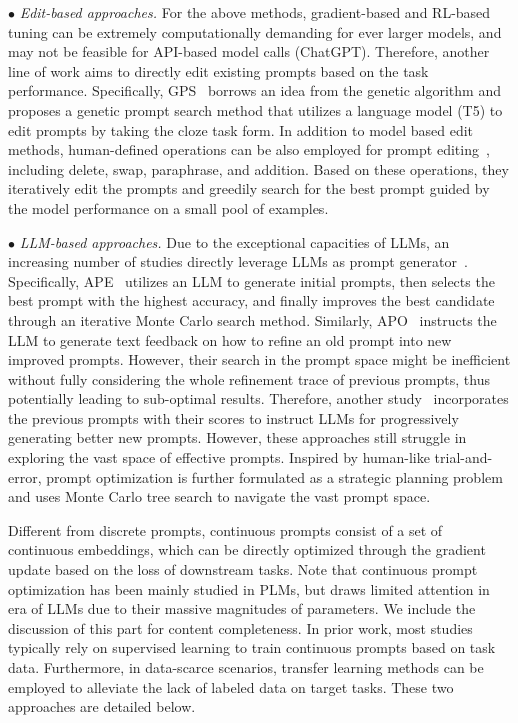 $\bullet$  {\textit{Edit-based approaches.} 
For the above methods, gradient-based and RL-based tuning can be extremely computationally demanding for ever larger models, and may not be feasible for API-based model calls (\eg ChatGPT). Therefore, another line of work aims to directly edit existing prompts based on the task performance. Specifically, GPS~\cite{Xu-EMNLP-2022-GPS} borrows an idea from the genetic algorithm and proposes a genetic prompt search method that utilizes a language model (\ie T5) to edit prompts by  taking the cloze task form. In addition to model based edit methods, human-defined  operations can be also employed for prompt editing~\cite{Prasad-EACL-2023-GrIPS}, including delete, swap, paraphrase, and addition. Based on these operations, they iteratively edit the prompts and greedily search for the best prompt guided by the model performance on a small pool of examples.}

$\bullet$  {\textit{LLM-based approaches.} Due to the exceptional capacities of LLMs, an increasing number of studies directly leverage LLMs as prompt generator~\cite{Zhou-ICLR-2023-Large,Pryzant-CoRR-2023-Automatic,Yang-CoRR-2023-Large}. Specifically, APE~\cite{Zhou-ICLR-2023-Large}  utilizes an LLM to generate initial prompts, then selects the best prompt with the highest accuracy, and finally improves the best candidate through an iterative Monte Carlo search method. Similarly, APO~\cite{Pryzant-CoRR-2023-Automatic} instructs the LLM to generate text feedback on how to refine an old prompt into new improved prompts. However, their search in the prompt space might be inefficient {without fully considering the whole refinement trace of previous prompts}, thus potentially leading to sub-optimal results. Therefore, another study~\cite{Yang-CoRR-2023-Large} incorporates the previous prompts with their scores to instruct LLMs for progressively generating better new prompts. However, these approaches still struggle in exploring the vast space of effective prompts. Inspired by human-like trial-and-error, prompt optimization is further formulated as a strategic planning problem~\cite{Wang-CoRR-2023-PromptAgent} and uses Monte Carlo tree search to navigate the vast prompt space.}


{Different from discrete prompts, continuous prompts consist of a set of continuous embeddings, which can be directly optimized through the gradient update based on the loss of downstream tasks. Note that continuous prompt optimization has been  mainly studied in PLMs, but draws limited attention in era of LLMs due to their massive magnitudes of parameters. We include the discussion of this part for content completeness. In prior work, most studies typically rely on supervised learning to train continuous prompts based on task data. Furthermore, in data-scarce scenarios, transfer learning methods can be employed to alleviate the lack of labeled data on target tasks. These two approaches are detailed below. 
}

